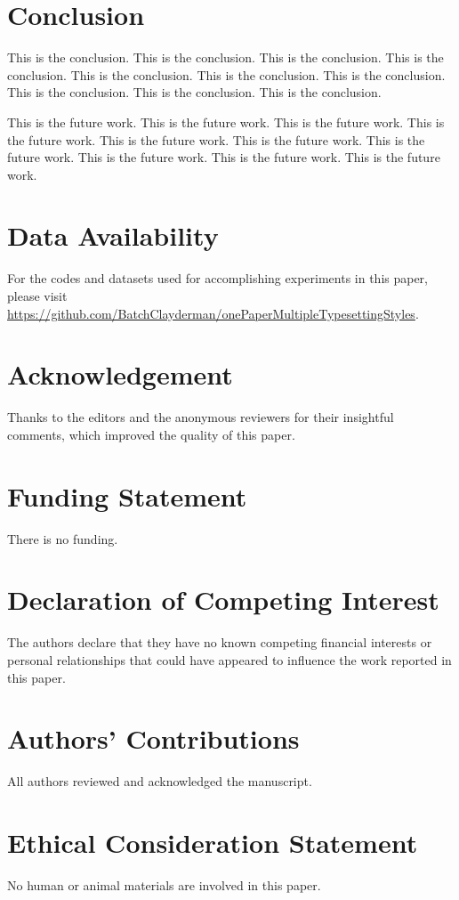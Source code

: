 \section{Conclusion}
\label{sec:6}

This is the conclusion. This is the conclusion. This is the conclusion. This is the conclusion. This is the conclusion. This is the conclusion. This is the conclusion. This is the conclusion. This is the conclusion. This is the conclusion. 

This is the future work. This is the future work. This is the future work. This is the future work. This is the future work. This is the future work. This is the future work. This is the future work. This is the future work. This is the future work. 

\section*{Data Availability}

For the codes and datasets used for accomplishing experiments in this paper, please visit \url{https://github.com/BatchClayderman/onePaperMultipleTypesettingStyles}. 

\section*{Acknowledgement}

Thanks to the editors and the anonymous reviewers for their insightful comments, which improved the quality of this paper. 

\section*{Funding Statement}

There is no funding. 

\section*{Declaration of Competing Interest}

The authors declare that they have no known competing financial interests or personal relationships that could have appeared to influence the work reported in this paper. 

\section*{Authors' Contributions}

All authors reviewed and acknowledged the manuscript. 

\section*{Ethical Consideration Statement}

No human or animal materials are involved in this paper. 